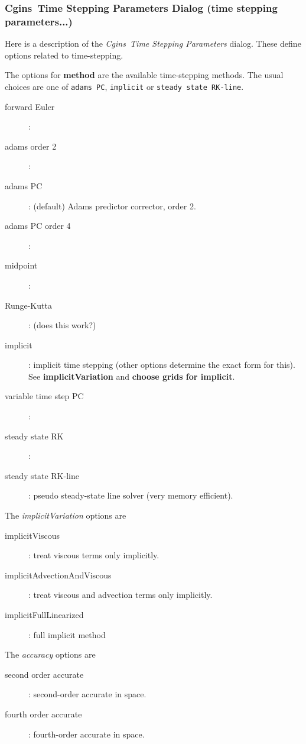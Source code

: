 \documentclass{article}
\newcommand{\Solver}{Cgins}
\begin{document}
\subsubsection{\Solver\ Time Stepping Parameters Dialog (time stepping parameters...)}
\label{sec:timeSteppingParameters}

Here is a description of the {\em \Solver\ Time Stepping Parameters} dialog. These define options
related to time-stepping.

\noindent The options for {\bf method} are the available time-stepping methods. 
The usual choices are one of {\tt adams PC}, {\tt implicit} or {\tt steady state RK-line}. 
\begin{description}
  \item[\qquad forward Euler] :
  \item[\qquad adams order 2] :
  \item[\qquad adams PC] : (default) Adams predictor corrector, order 2.
  \item[\qquad adams PC order 4] :
  \item[\qquad midpoint] :
  \item[\qquad Runge-Kutta] : (does this work?)
  \item[\qquad implicit] : implicit time stepping (other options determine the exact form for this). 
             See {\bf implicitVariation} and {\bf choose grids for implicit}. 
  \item[\qquad variable time step PC] :
  \item[\qquad steady state RK] :
  \item[\qquad steady state RK-line] : pseudo steady-state line solver (very memory efficient). 
\end{description}


\noindent The {\em implicitVariation} options are
\begin{description}
  \item[\qquad implicitViscous] : treat viscous terms only implicitly. 
  \item[\qquad implicitAdvectionAndViscous] : treat viscous and advection terms only implicitly. 
  \item[\qquad implicitFullLinearized] : full implicit method
\end{description}
      

\noindent The {\em accuracy} options are
\begin{description}
  \item[\qquad second order accurate] : second-order accurate in space.
  \item[\qquad fourth order accurate] : fourth-order accurate in space.
\end{description}
\end{document}
